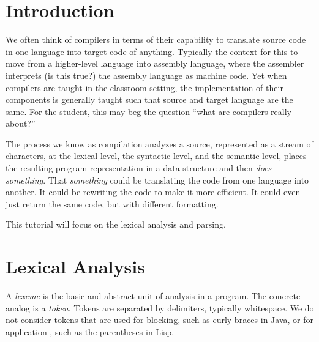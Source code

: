 \documentclass{article}[12pt]
\begin{document}
\section{Introduction}
We often think of compilers in terms of their capability to translate source code in one language into target code of anything. Typically the context for this to move from a higher-level language into assembly language, where the assembler interprets (is this true?) the assembly language as machine code. Yet when compilers are taught in the classroom setting, the implementation of their components is generally taught such that source and target language are the same. For the student, this may beg the question ``what are compilers really about?''

The process we know as compilation analyzes a source, represented as a stream of characters, at the lexical level, the syntactic level, and the semantic level, places the resulting program representation in a data structure and then \emph{does something}. That \emph{something} could be translating the code from one language into another. It could be rewriting the code to make it more efficient. It could even just return the same code, but with different formatting. 

This tutorial will focus on the lexical analysis and parsing. 

\section{Lexical Analysis}
A \emph{lexeme} is the basic and abstract unit of analysis in a program. The concrete analog is a \emph{token}. Tokens are separated by delimiters, typically whitespace. We do not consider tokens that are used for blocking, such as curly braces in Java, or for application\footnotemark {}
, such as the parentheses in Lisp. 
\end{document}
